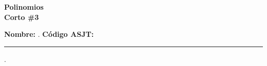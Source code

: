 \begin{center} \textbf
{
    \Large Polinomios \\ \vspace{2mm}Corto \#3
}
\end{center}

\textbf{Nombre:} \hrulefill. \textbf{ Código ASJT:} \rule{2cm}{0.1mm}.
\vspace{-4mm}

